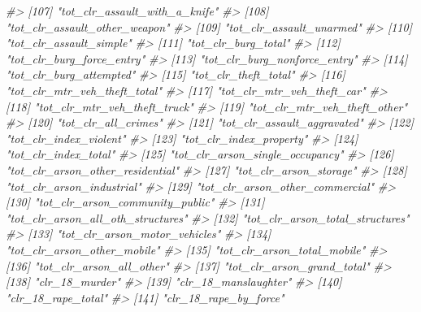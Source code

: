 \documentclass[
]{krantz}
\makeatletter
\newenvironment{Shaded}{\begin{snugshade}}{\end{snugshade}}
\newcommand{\CommentTok}[1]{\textcolor[rgb]{0.37,0.37,0.37}{\textit{#1}}}
\newenvironment{kframe}{%
\medskip{}
\setlength{\fboxsep}{.8em}
 \def\at@end@of@kframe{}%
 \ifinner\ifhmode%
  \def\at@end@of@kframe{\end{minipage}}%
  \begin{minipage}{\columnwidth}%
 \fi\fi%
 \def\FrameCommand##1{\hskip\@totalleftmargin \hskip-\fboxsep
 \colorbox{shadecolor}{##1}\hskip-\fboxsep
     \hskip-\linewidth \hskip-\@totalleftmargin \hskip\columnwidth}%
 \MakeFramed {\advance\hsize-\width
   \@totalleftmargin\z@ \linewidth\hsize
   \@setminipage}}%
 {\par\unskip\endMakeFramed%
 \at@end@of@kframe}
\renewenvironment{Shaded}{\begin{kframe}}{\end{kframe}}
\makeatother
\begin{document}
\begin{Shaded}
\begin{Highlighting}[]
\CommentTok{\#\textgreater{} [107] "tot\_clr\_assault\_with\_a\_knife"    }
\CommentTok{\#\textgreater{} [108] "tot\_clr\_assault\_other\_weapon"    }
\CommentTok{\#\textgreater{} [109] "tot\_clr\_assault\_unarmed"         }
\CommentTok{\#\textgreater{} [110] "tot\_clr\_assault\_simple"          }
\CommentTok{\#\textgreater{} [111] "tot\_clr\_burg\_total"              }
\CommentTok{\#\textgreater{} [112] "tot\_clr\_burg\_force\_entry"        }
\CommentTok{\#\textgreater{} [113] "tot\_clr\_burg\_nonforce\_entry"     }
\CommentTok{\#\textgreater{} [114] "tot\_clr\_burg\_attempted"          }
\CommentTok{\#\textgreater{} [115] "tot\_clr\_theft\_total"             }
\CommentTok{\#\textgreater{} [116] "tot\_clr\_mtr\_veh\_theft\_total"     }
\CommentTok{\#\textgreater{} [117] "tot\_clr\_mtr\_veh\_theft\_car"       }
\CommentTok{\#\textgreater{} [118] "tot\_clr\_mtr\_veh\_theft\_truck"     }
\CommentTok{\#\textgreater{} [119] "tot\_clr\_mtr\_veh\_theft\_other"     }
\CommentTok{\#\textgreater{} [120] "tot\_clr\_all\_crimes"              }
\CommentTok{\#\textgreater{} [121] "tot\_clr\_assault\_aggravated"      }
\CommentTok{\#\textgreater{} [122] "tot\_clr\_index\_violent"           }
\CommentTok{\#\textgreater{} [123] "tot\_clr\_index\_property"          }
\CommentTok{\#\textgreater{} [124] "tot\_clr\_index\_total"             }
\CommentTok{\#\textgreater{} [125] "tot\_clr\_arson\_single\_occupancy"  }
\CommentTok{\#\textgreater{} [126] "tot\_clr\_arson\_other\_residential" }
\CommentTok{\#\textgreater{} [127] "tot\_clr\_arson\_storage"           }
\CommentTok{\#\textgreater{} [128] "tot\_clr\_arson\_industrial"        }
\CommentTok{\#\textgreater{} [129] "tot\_clr\_arson\_other\_commercial"  }
\CommentTok{\#\textgreater{} [130] "tot\_clr\_arson\_community\_public"  }
\CommentTok{\#\textgreater{} [131] "tot\_clr\_arson\_all\_oth\_structures"}
\CommentTok{\#\textgreater{} [132] "tot\_clr\_arson\_total\_structures"  }
\CommentTok{\#\textgreater{} [133] "tot\_clr\_arson\_motor\_vehicles"    }
\CommentTok{\#\textgreater{} [134] "tot\_clr\_arson\_other\_mobile"      }
\CommentTok{\#\textgreater{} [135] "tot\_clr\_arson\_total\_mobile"      }
\CommentTok{\#\textgreater{} [136] "tot\_clr\_arson\_all\_other"         }
\CommentTok{\#\textgreater{} [137] "tot\_clr\_arson\_grand\_total"       }
\CommentTok{\#\textgreater{} [138] "clr\_18\_murder"                   }
\CommentTok{\#\textgreater{} [139] "clr\_18\_manslaughter"             }
\CommentTok{\#\textgreater{} [140] "clr\_18\_rape\_total"               }
\CommentTok{\#\textgreater{} [141] "clr\_18\_rape\_by\_force"            }

\end{Highlighting}
\end{Shaded}
\end{document}
